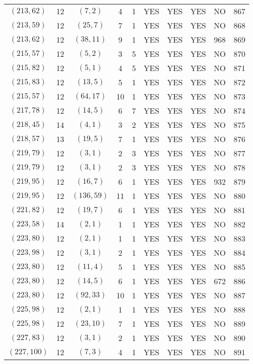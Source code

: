 \begin{longtable}{|c|c|c|c|c|c|c|c|c|c|}
$(213, 62)$ & 12 & $(7, 2)$ & 4 & 1 & YES & YES & YES & NO & 867\\
$(213, 59)$ & 12 & $(25, 7)$ & 7 & 1 & YES & YES & YES & NO & 868\\
$(213, 62)$ & 12 & $(38, 11)$ & 9 & 1 & YES & YES & YES & 968 & 869\\
$(215, 57)$ & 12 & $(5, 2)$ & 3 & 5 & YES & YES & YES & NO & 870\\
$(215, 82)$ & 12 & $(5, 1)$ & 4 & 5 & YES & YES & YES & NO & 871\\
$(215, 83)$ & 12 & $(13, 5)$ & 5 & 1 & YES & YES & YES & NO & 872\\
$(215, 57)$ & 12 & $(64, 17)$ & 10 & 1 & YES & YES & YES & NO & 873\\
$(217, 78)$ & 12 & $(14, 5)$ & 6 & 7 & YES & YES & YES & NO & 874\\
$(218, 45)$ & 14 & $(4, 1)$ & 3 & 2 & YES & YES & YES & NO & 875\\
$(218, 57)$ & 13 & $(19, 5)$ & 7 & 1 & YES & YES & YES & NO & 876\\
$(219, 79)$ & 12 & $(3, 1)$ & 2 & 3 & YES & YES & YES & NO & 877\\
$(219, 79)$ & 12 & $(3, 1)$ & 2 & 3 & YES & YES & YES & NO & 878\\
$(219, 95)$ & 12 & $(16, 7)$ & 6 & 1 & YES & YES & YES & 932 & 879\\
$(219, 95)$ & 12 & $(136, 59)$ & 11 & 1 & YES & YES & YES & NO & 880\\
$(221, 82)$ & 12 & $(19, 7)$ & 6 & 1 & YES & YES & YES & NO & 881\\
$(223, 58)$ & 14 & $(2, 1)$ & 1 & 1 & YES & YES & YES & NO & 882\\
$(223, 80)$ & 12 & $(2, 1)$ & 1 & 1 & YES & YES & YES & NO & 883\\
$(223, 98)$ & 12 & $(3, 1)$ & 2 & 1 & YES & YES & YES & NO & 884\\
$(223, 80)$ & 12 & $(11, 4)$ & 5 & 1 & YES & YES & YES & NO & 885\\
$(223, 80)$ & 12 & $(14, 5)$ & 6 & 1 & YES & YES & YES & 672 & 886\\
$(223, 80)$ & 12 & $(92, 33)$ & 10 & 1 & YES & YES & YES & NO & 887\\
$(225, 98)$ & 12 & $(2, 1)$ & 1 & 1 & YES & YES & YES & NO & 888\\
$(225, 98)$ & 12 & $(23, 10)$ & 7 & 1 & YES & YES & YES & NO & 889\\
$(227, 83)$ & 12 & $(3, 1)$ & 2 & 1 & YES & YES & YES & NO & 890\\
$(227, 100)$ & 12 & $(7, 3)$ & 4 & 1 & YES & YES & YES & NO & 891\\

\end{longtable}
